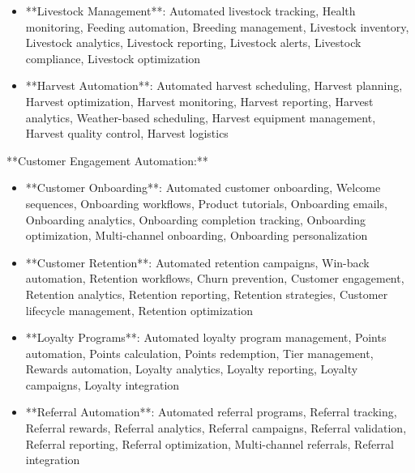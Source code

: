 \documentclass[11pt,a4paper]{article}
\begin{document}
\begin{itemize}
\item **Livestock Management**: Automated livestock tracking, Health monitoring, Feeding automation, Breeding management, Livestock inventory, Livestock analytics, Livestock reporting, Livestock alerts, Livestock compliance, Livestock optimization
\end{itemize}

\begin{itemize}
\item **Harvest Automation**: Automated harvest scheduling, Harvest planning, Harvest optimization, Harvest monitoring, Harvest reporting, Harvest analytics, Weather-based scheduling, Harvest equipment management, Harvest quality control, Harvest logistics
\end{itemize}

**Customer Engagement Automation:**

\begin{itemize}
\item **Customer Onboarding**: Automated customer onboarding, Welcome sequences, Onboarding workflows, Product tutorials, Onboarding emails, Onboarding analytics, Onboarding completion tracking, Onboarding optimization, Multi-channel onboarding, Onboarding personalization
\end{itemize}

\begin{itemize}
\item **Customer Retention**: Automated retention campaigns, Win-back automation, Retention workflows, Churn prevention, Customer engagement, Retention analytics, Retention reporting, Retention strategies, Customer lifecycle management, Retention optimization
\end{itemize}

\begin{itemize}
\item **Loyalty Programs**: Automated loyalty program management, Points automation, Points calculation, Points redemption, Tier management, Rewards automation, Loyalty analytics, Loyalty reporting, Loyalty campaigns, Loyalty integration
\end{itemize}

\begin{itemize}
\item **Referral Automation**: Automated referral programs, Referral tracking, Referral rewards, Referral analytics, Referral campaigns, Referral validation, Referral reporting, Referral optimization, Multi-channel referrals, Referral integration
\end{itemize}
\end{document}

